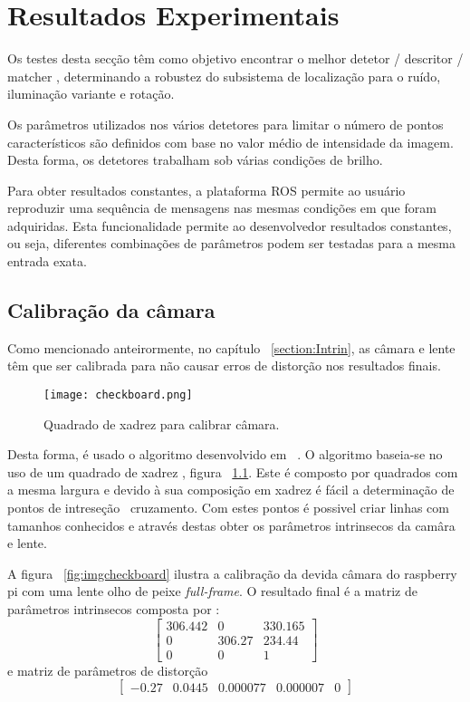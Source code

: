 \chapter{Resultados Experimentais} \label{chap:resexp}


Os testes desta secção têm como objetivo encontrar o melhor detetor / descritor / matcher , determinando a robustez do subsistema de localização para o ruído, iluminação variante e rotação.

Os parâmetros utilizados nos vários detetores para limitar o número de pontos característicos são definidos com base no valor médio de intensidade da imagem. Desta forma, os detetores trabalham sob várias condições de brilho.

Para obter resultados constantes, a plataforma ROS permite ao usuário reproduzir uma sequência de mensagens nas mesmas condições em que foram adquiridas. Esta funcionalidade permite ao desenvolvedor resultados constantes, ou seja, diferentes combinações de parâmetros podem ser testadas para a mesma entrada exata.

\section{Calibração da câmara}

Como mencionado anteirormente, no capítulo ~\ref{section:Intrin}, as câmara e lente têm que ser calibrada para não causar erros de distorção nos resultados finais. 

\begin{figure}[h!]  %
	\centering
	\texttt{[image: checkboard.png]} 
	\caption{Quadrado de xadrez para calibrar câmara.}
	\label{fig:checkboard}  %
\end{figure}

Desta forma, é usado o algoritmo desenvolvido em ~\cite{piCam}. O algoritmo baseia-se no uso de um quadrado de xadrez , figura ~\ref{fig:checkboard}. Este é composto por quadrados com a mesma largura e devido à sua composição em xadrez é fácil a determinação de pontos de intreseção \ cruzamento. Com estes pontos é possivel criar linhas com tamanhos conhecidos e através destas obter os parâmetros intrinsecos da camâra e lente. 



A figura ~\ref{fig:imgcheckboard} ilustra a calibração da devida câmara do raspberry pi com uma lente olho de peixe \textit{full-frame}. O resultado final é a matriz de parâmetros intrinsecos composta por : \[ \left[ \begin{array}{ccc}
306.442 & 0 & 330.165 \\ 
0 & 306.27 & 234.44 \\ 
0 & 0 & 1
\end{array} \right] \] e matriz de parâmetros de distorção \[ \left[\begin{array}{ccccc}
-0.27 & 0.0445 & 0.000077 & 0.000007 & 0 
\end{array} \right] \]

